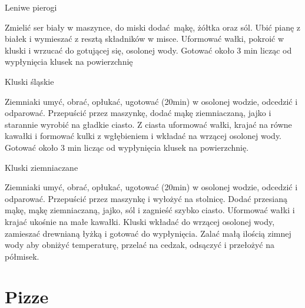 \documentclass[a4paper,12pt]{article}
\begin{document}
\begin{recipe}{Leniwe pierogi}{}{}

Zmielić ser biały w maszynce, do miski dodać mąkę, żółtka oraz sól. Ubić pianę z białek
i wymieszać z resztą składników w misce. Uformować wałki, pokroić w kluski i
wrzucać do gotującej się, osolonej wody.
Gotować około 3 min licząc od wypłynięcia klusek na powierzchnię 

\end{recipe}

\begin{recipe}{Kluski śląskie}{}{}

Ziemniaki umyć, obrać, opłukać, ugotować (20min) w osolonej wodzie, odcedzić i
odparować. Przepuścić przez maszynkę, dodać mąkę ziemniaczaną, jajko i
starannie wyrobić na gładkie ciasto.
\freeform%
Z ciasta uformować wałki, krajać na równe
kawałki i formować kulki z wgłębieniem i wkładać na wrzącej osolonej wody.
Gotować około 3 min licząc od wypłynięcia klusek na powierzchnię. 

\end{recipe}


\begin{recipe}{Kluski ziemniaczane}{}{}

Ziemniaki umyć, obrać, opłukać, ugotować (20min) w osolonej wodzie, odcedzić i
odparować. Przepuścić przez maszynkę i wyłożyć na stolnicę. Dodać przesianą
mąkę, mąkę ziemniaczaną, jajko, sól i zagnieść szybko ciasto.
\freeform%
Uformować wałki i
krajać ukośnie na małe kawałki. Kluski wkładać do wrzącej osolonej wody,
zamieszać drewnianą łyżką i gotować do wypłynięcia. Zalać małą ilością zimnej
wody aby obniżyć temperaturę, przelać na cedzak, odsączyć i przełożyć na
półmisek.

\end{recipe}


\newpage
\section{Pizze}
\end{document}
